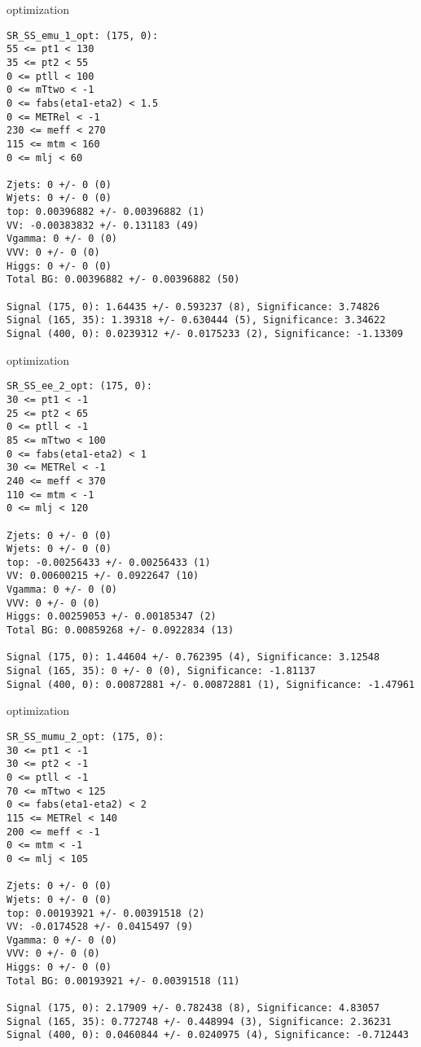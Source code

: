 \begin{frame}[fragile]{optimization}
\tiny
\begin{verbatim}
SR_SS_emu_1_opt: (175, 0):
55 <= pt1 < 130
35 <= pt2 < 55
0 <= ptll < 100
0 <= mTtwo < -1
0 <= fabs(eta1-eta2) < 1.5
0 <= METRel < -1
230 <= meff < 270
115 <= mtm < 160
0 <= mlj < 60

Zjets: 0 +/- 0 (0)
Wjets: 0 +/- 0 (0)
top: 0.00396882 +/- 0.00396882 (1)
VV: -0.00383832 +/- 0.131183 (49)
Vgamma: 0 +/- 0 (0)
VVV: 0 +/- 0 (0)
Higgs: 0 +/- 0 (0)
Total BG: 0.00396882 +/- 0.00396882 (50)

Signal (175, 0): 1.64435 +/- 0.593237 (8), Significance: 3.74826
Signal (165, 35): 1.39318 +/- 0.630444 (5), Significance: 3.34622
Signal (400, 0): 0.0239312 +/- 0.0175233 (2), Significance: -1.13309
\end{verbatim}
\end{frame}

\begin{frame}[fragile]{optimization}
\tiny
\begin{verbatim}
SR_SS_ee_2_opt: (175, 0):
30 <= pt1 < -1
25 <= pt2 < 65
0 <= ptll < -1
85 <= mTtwo < 100
0 <= fabs(eta1-eta2) < 1
30 <= METRel < -1
240 <= meff < 370
110 <= mtm < -1
0 <= mlj < 120

Zjets: 0 +/- 0 (0)
Wjets: 0 +/- 0 (0)
top: -0.00256433 +/- 0.00256433 (1)
VV: 0.00600215 +/- 0.0922647 (10)
Vgamma: 0 +/- 0 (0)
VVV: 0 +/- 0 (0)
Higgs: 0.00259053 +/- 0.00185347 (2)
Total BG: 0.00859268 +/- 0.0922834 (13)

Signal (175, 0): 1.44604 +/- 0.762395 (4), Significance: 3.12548
Signal (165, 35): 0 +/- 0 (0), Significance: -1.81137
Signal (400, 0): 0.00872881 +/- 0.00872881 (1), Significance: -1.47961
\end{verbatim}
\end{frame}

\begin{frame}[fragile]{optimization}
\tiny
\begin{verbatim}
SR_SS_mumu_2_opt: (175, 0):
30 <= pt1 < -1
30 <= pt2 < -1
0 <= ptll < -1
70 <= mTtwo < 125
0 <= fabs(eta1-eta2) < 2
115 <= METRel < 140
200 <= meff < -1
0 <= mtm < -1
0 <= mlj < 105

Zjets: 0 +/- 0 (0)
Wjets: 0 +/- 0 (0)
top: 0.00193921 +/- 0.00391518 (2)
VV: -0.0174528 +/- 0.0415497 (9)
Vgamma: 0 +/- 0 (0)
VVV: 0 +/- 0 (0)
Higgs: 0 +/- 0 (0)
Total BG: 0.00193921 +/- 0.00391518 (11)

Signal (175, 0): 2.17909 +/- 0.782438 (8), Significance: 4.83057
Signal (165, 35): 0.772748 +/- 0.448994 (3), Significance: 2.36231
Signal (400, 0): 0.0460844 +/- 0.0240975 (4), Significance: -0.712443
\end{verbatim}
\end{frame}

